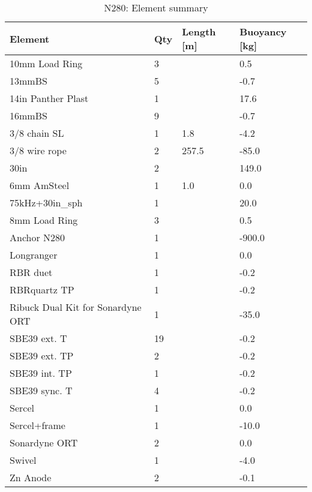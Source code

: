 \documentclass{article}
\begin{document}
\begin{table}[!htbp]
\centering
\caption{N280: Element summary}
\begin{tabular}{llll}
\toprule
Element & Qty & Length [m] & Buoyancy [kg] \\
\midrule
10mm Load Ring & 3 &  & 0.5 \\
13mmBS & 5 &  & -0.7 \\
14in Panther Plast & 1 &  & 17.6 \\
16mmBS & 9 &  & -0.7 \\
3/8 chain SL & 1 & 1.8 & -4.2 \\
3/8 wire rope & 2 & 257.5 & -85.0 \\
30in & 2 &  & 149.0 \\
6mm AmSteel & 1 & 1.0 & 0.0 \\
75kHz+30in\_sph & 1 &  & 20.0 \\
8mm Load Ring & 3 &  & 0.5 \\
Anchor N280 & 1 &  & -900.0 \\
Longranger & 1 &  & 0.0 \\
RBR duet & 1 &  & -0.2 \\
RBRquartz TP & 1 &  & -0.2 \\
Ribuck Dual Kit for Sonardyne ORT & 1 &  & -35.0 \\
SBE39 ext. T & 19 &  & -0.2 \\
SBE39 ext. TP & 2 &  & -0.2 \\
SBE39 int. TP & 1 &  & -0.2 \\
SBE39 sync. T & 4 &  & -0.2 \\
Sercel & 1 &  & 0.0 \\
Sercel+frame & 1 &  & -10.0 \\
Sonardyne ORT & 2 &  & 0.0 \\
Swivel & 1 &  & -4.0 \\
Zn Anode & 2 &  & -0.1 \\
\bottomrule
\end{tabular}
\end{table}
\end{document}
